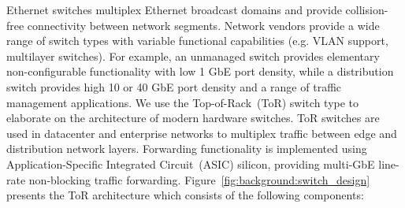 Ethernet switches multiplex Ethernet broadcast domains and provide
collision-free connectivity between network segments.  Network vendors provide
a wide range of switch types with variable functional capabilities (e.g. VLAN
support, multilayer switches).  For example, an unmanaged switch provides
elementary non-configurable functionality with low 1 GbE port density, while a
distribution switch provides high 10 or 40 GbE port density and a range of
traffic management applications.  We use the Top-of-Rack~(ToR) switch type to
elaborate on the architecture of modern hardware switches.  ToR switches are
used in datacenter and enterprise networks to multiplex traffic between
edge and distribution network layers. Forwarding functionality is
implemented  using Application-Specific Integrated Circuit~(ASIC) silicon,
providing multi-GbE line-rate non-blocking traffic forwarding.
Figure~\ref{fig:background:switch_design} presents the ToR architecture
which consists of the following components:

